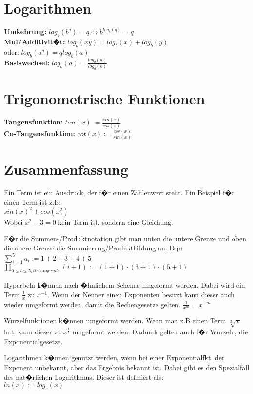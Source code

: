\section*{Logarithmen}
\textbf{Umkehrung:} $log_b(b^q) = q \Leftrightarrow b^{log_b(q)} = q$\\
\textbf{Mul/Additivit�t:} $log_b(xy) = log_b(x) + log_b(y)$\\
oder: $log_b(a^q) = q log_b(a)$\\
\textbf{Basiswechsel:} $log_b(a) = \frac{log_d(a)}{log_d(b)}$

\section*{Trigonometrische Funktionen}
\textbf{Tangensfunktion:} $tan(x) := \frac{sin(x)}{cos(x)}$\\
\textbf{Co-Tangensfunktion:} $cot(x) := \frac{cos(x)}{sin(x)}$

\section*{Zusammenfassung}
Ein Term ist ein Ausdruck, der f�r einen Zahlenwert steht. Ein Beispiel f�r einen Term ist z.B:\\
$sin(x)^2 + cos(x^2)$\\
Wobei $x^2 - 3 = 0$ kein Term ist, sondern eine Gleichung.

F�r die Summen-/Produktnotation gibt man unten die untere Grenze und oben die obere Grenze die Summierung/Produktbildung an. Bsp:\\
$\sum_{i=1}^{5}a_i := 1 + 2 + 3 + 4 + 5$\\
$\prod_{0\leq i\leq 5, i ist ungerade}^{} (i + 1):= (1 + 1) \cdot (3 + 1) \cdot (5 + 1)$

Hyperbeln k�nnen nach �hnlichem Schema umgeformt werden. Dabei wird ein Term $\frac{1}{x}$ zu $x^{-1}$. Wenn der Nenner einen Exponenten besitzt kann dieser auch wieder umgeformt werden, damit die Rechengesetze gelten.	$\frac{1}{x^m} = x^{-m}$

Wurzelfunktionen k�nnen umgeformt werden. Wenn man z.B einen Term $\sqrt[2]{x}$ hat, kann dieser zu $x^\frac{1}{2}$ umgeformt werden. Dadurch gelten auch f�r Wurzeln, die Exponentialgesetze.	

Logarithmen k�nnen genutzt werden, wenn bei einer Exponentialfkt. der Exponent unbekannt, aber das Ergebnis bekannt ist. Dabei gibt es den Spezialfall des nat�rlichen Logarithmus. Dieser ist definiert als:\\
$ln(x) := log_e(x)$





